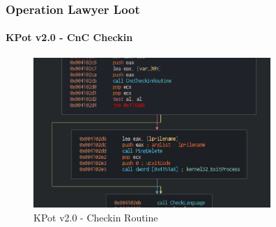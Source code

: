 \documentclass[aspectratio=169]{beamer}
\begin{document}
{
\begin{frame}
  \frametitle{Operation Lawyer Loot}
  \framesubtitle{KPot v2.0 - CnC Checkin}
  \begin{figure}
    \includegraphics[width=9cm]{kpot-cnc-checkin-routine}
    \caption{KPot v2.0 - Checkin Routine}
  \end{figure}
\end{frame}
}
\end{document}
